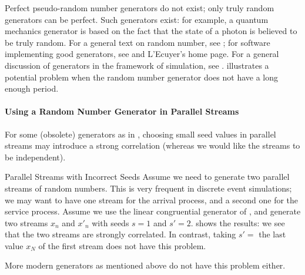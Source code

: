 \begin{figure}[!htb]
\begin{center}
\end{center}
\end{figure}
Perfect pseudo-random number generators do not exist; only
truly random generators can be perfect. Such generators exist:
for example, a quantum mechanics generator is based on the fact
that the state of a photon is believed to be truly random. For
a general text on random number, see \cite{l1998random}; for
software implementing good generators, see \cite{l2001software}
and L'Ecuyer's home page. For a general discussion of
generators in the framework of simulation, see
\cite{hechenleitner1000shortcomings}. 
illustrates a potential problem when the random number
generator does not have a long enough period.


\paragraph{Using a Random Number Generator in Parallel Streams}
For some (obsolete) generators as in , choosing
small seed values in parallel streams may introduce a strong
correlation (whereas we would like the streams to be independent).
\begin{ex}{Parallel Streams with Incorrect Seeds}
Assume we need to generate two parallel streams of random numbers.
This is very frequent in discrete event simulations; we may want
to have one stream for the arrival process, and a second one for
the service process. Assume we use the linear congruential
generator of , and generate two streams $x_n$ and
$x'_n$ with seeds $s=1$ and $s'=2$.  shows the
results: we see that the two streams are strongly correlated. In
contrast, taking $s'=$ the last value $x_N$ of the first stream
does not have this problem.

More modern generators as mentioned above do not have this problem
either.
\end{ex}
\begin{figure}[!htb]
 \begin{center}
 \end{center}%
\end{figure}

